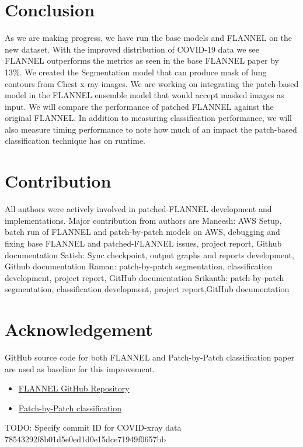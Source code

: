 \documentclass{sigkddExp}
\begin{document}
\section{Conclusion}
As we are making progress, we have run the base models and FLANNEL on the new
dataset. With the improved distribution of COVID-19 data we see FLANNEL
outperforms the metrics as seen in the base FLANNEL paper by 13\%. We created the
Segmentation model that can produce mask of lung contours from Chest x-ray
images. We are working on integrating the patch-based model in the FLANNEL
ensemble model that would accept masked images as input. We will compare the
performance of patched FLANNEL against the original FLANNEL. In addition to
measuring classification performance, we will also measure timing performance to
note how much of an impact the patch-based classification technique has on
runtime.


\section{Contribution}

All authors were actively involved in patched-FLANNEL development and
implementations. Major contribution from authors are Maneesh: AWS Setup, batch
run of FLANNEL and patch-by-patch models on AWS, debugging and fixing base
FLANNEL and patched-FLANNEL issues, project report, Github documentation Satish:
Sync checkpoint, output graphs and reports development, Github documentation
Raman: patch-by-patch segmentation, classification development, project report,
GitHub documentation Srikanth: patch-by-patch segmentation, classification
development, project report,GitHub documentation



\section{Acknowledgement}
GitHub source code for both FLANNEL and Patch-by-Patch classification
\cite{pmid32396075} paper are used as baseline for this improvement.
\begin{itemize}
    \item \href{https://github.com/qxiaobu/FLANNEL}{FLANNEL GitHub Repository}
    \item \href{https://github.com/jongcye/Deep-Learning-COVID-19-on-CXR-using-Limited-Training-Data-Sets}
          {Patch-by-Patch classification}
\end{itemize}

TODO: Specify commit ID for COVID-xray data 78543292f8b01d5e0ed1d0e15dce71949f0657bb

\clearpage
%

\end{document}

